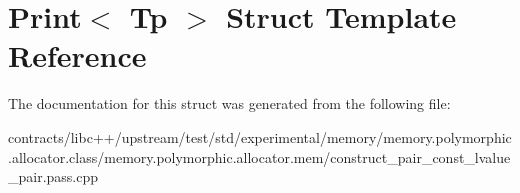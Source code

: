 \hypertarget{struct_print}{}\section{Print$<$ Tp $>$ Struct Template Reference}
\label{struct_print}


The documentation for this struct was generated from the following file\+:\begin{DoxyCompactItemize}
\item 
contracts/libc++/upstream/test/std/experimental/memory/memory.\+polymorphic.\+allocator.\+class/memory.\+polymorphic.\+allocator.\+mem/construct\+\_\+pair\+\_\+const\+\_\+lvalue\+\_\+pair.\+pass.\+cpp\end{DoxyCompactItemize}
